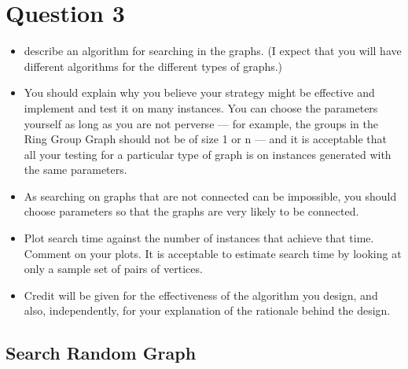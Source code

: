 \documentclass[11pt,a4paper,notitlepage]{article}
\begin{document}
\section*{Question 3}
\begin{itemize}
    \item describe an algorithm for searching in the graphs. (I expect that you will have different algorithms for the different types of graphs.) 
    \item You should explain why you believe your strategy might be effective and implement and test it on many instances. You can choose the parameters yourself as long as you are not perverse — for example, the groups in the Ring Group Graph should not be of size 1 or n — and it is acceptable that all your testing for a particular type of graph is on instances generated with the same parameters. 
    \item As searching on graphs that are not connected can be impossible, you should choose parameters so that the graphs are very likely to be connected. 
    \item Plot search time against the number of instances that achieve that time. Comment on your plots. It is acceptable to estimate search time by looking at only a sample set of pairs of vertices. 
    \item Credit will be given for the effectiveness of the algorithm you design, and also, independently, for your explanation of the rationale behind the design.
\end{itemize}

\subsection*{Search Random Graph}
\end{document}
